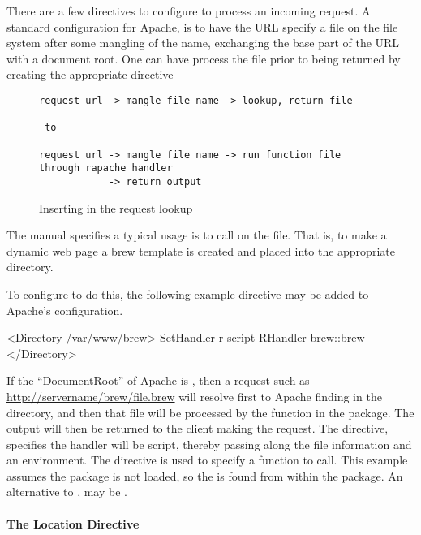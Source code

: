 There are a few directives to configure  to process an
incoming request. A standard configuration for Apache, is to have the
URL specify a file on the file system after some mangling of the name,
exchanging the base part of the URL with a document root. One can have
 process the file prior to being returned by creating the
appropriate directive

\begin{figure}
  \centering
\begin{verbatim}
request url -> mangle file name -> lookup, return file

 to

request url -> mangle file name -> run function file through rapache handler
            -> return output
\end{verbatim}
  \caption{Inserting  in the request lookup}
  \label{sec:rapache-brew}
\end{figure}


The  manual specifies a typical usage is to call
 on the file.  That is, to make a dynamic web page a
brew template is created and placed into the appropriate
directory.

To configure  to do this, the following example directive
may be added to Apache's configuration.
\begin{HTMLinput}
<Directory /var/www/brew>
  SetHandler r-script
  RHandler brew::brew
</Directory>
\end{HTMLinput}

If the ``DocumentRoot'' of Apache is , then a request
such as \url{http://servername/brew/file.brew} will resolve first to
Apache finding  in the 
directory, and then that file will be processed by the 
function in the  package. The output will then be returned
to the client making the request. The  directive,
specifies the handler will be script, thereby passing along the file
information and an environment. The  directive is used
to specify a function to call. This example assumes the 
package is not loaded, so the  is found from within the
package. An alternative to , may be
.


\paragraph{The Location Directive}


